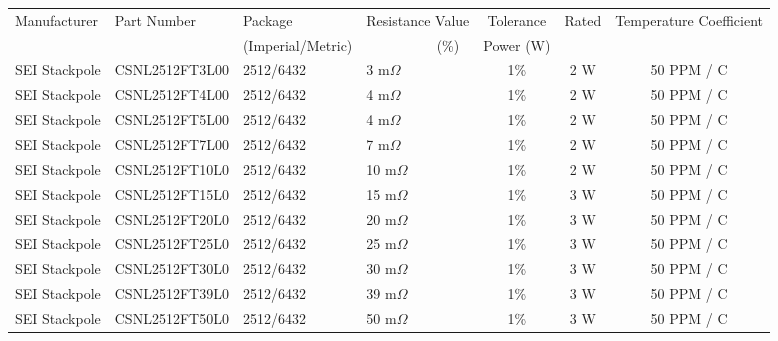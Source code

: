 \begin{tabular}{lllllccc}
Manufacturer & Part Number  & Package & \multicolumn{2}{l}{Resistance Value} & Tolerance  & Rated  & Temperature Coefficient\\
 & & (Imperial/Metric) &  & (\%) & Power (W) & \\
\hline
SEI Stackpole\quad & CSNL2512FT3L00\quad  & 2512/6432\quad  & 3 m$\Omega$ && 1\% & 2 W & 50 PPM / C \\ \hline
SEI Stackpole\quad & CSNL2512FT4L00\quad  & 2512/6432\quad  & 4 m$\Omega$ && 1\% & 2 W & 50 PPM / C \\ \hline
SEI Stackpole\quad & CSNL2512FT5L00\quad  & 2512/6432\quad  & 4 m$\Omega$ && 1\% & 2 W & 50 PPM / C \\ \hline
SEI Stackpole\quad & CSNL2512FT7L00\quad  & 2512/6432\quad  & 7 m$\Omega$ && 1\% & 2 W & 50 PPM / C \\ \hline
SEI Stackpole\quad & CSNL2512FT10L0\quad  & 2512/6432\quad  & 10 m$\Omega$ && 1\% & 2 W & 50 PPM / C \\ \hline
SEI Stackpole\quad & CSNL2512FT15L0\quad  & 2512/6432\quad  & 15 m$\Omega$ && 1\% & 3 W & 50 PPM / C \\ \hline
SEI Stackpole\quad & CSNL2512FT20L0\quad  & 2512/6432\quad  & 20 m$\Omega$ && 1\% & 3 W & 50 PPM / C \\ \hline
SEI Stackpole\quad & CSNL2512FT25L0\quad  & 2512/6432\quad  & 25 m$\Omega$ && 1\% & 3 W & 50 PPM / C \\ \hline
SEI Stackpole\quad & CSNL2512FT30L0\quad  & 2512/6432\quad  & 30 m$\Omega$ && 1\% & 3 W & 50 PPM / C \\ \hline
SEI Stackpole\quad & CSNL2512FT39L0\quad  & 2512/6432\quad  & 39 m$\Omega$ && 1\% & 3 W & 50 PPM / C \\ \hline
SEI Stackpole\quad & CSNL2512FT50L0\quad  & 2512/6432\quad  & 50 m$\Omega$ && 1\% & 3 W & 50 PPM / C \\ \hline
\end{tabular}